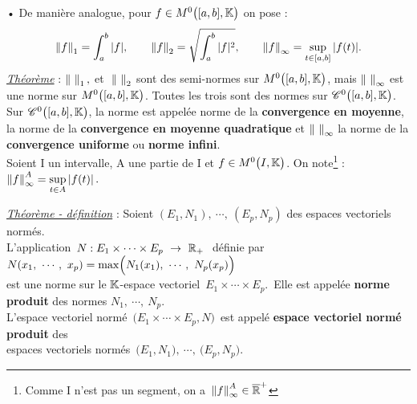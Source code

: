• De manière analogue, pour \(f\in M^0\bigl([a,b],\mathbb{K}\bigr) \) on pose :\vspace{-0.3cm}
\[ \left\lVert f\right\rVert_1=\int_a^b |f|, \qquad \left\lVert f\right\rVert_2=\sqrt{\int_a^b |f|^2}, \qquad \left\lVert f\right\rVert_\infty = \sup_{t\in [a,b]} |f(t)|.\]
\underline{\emph{Théorème}} : \(\left\lVert\ \right\rVert_1,\) et \(\ \left\lVert\ \right\rVert_2  \) sont des semi-normes sur \(M^0\bigl([a,b],\mathbb{K}\bigr)\), mais \(\left\lVert\ \right\rVert_\infty\) est une norme sur \(M^0\bigl([a,b],\mathbb{K}\bigr)\). Toutes les trois sont des normes sur \(\mathscr{C}^0\bigl([a,b],\mathbb{K}\bigr)\).\\
Sur \(\mathscr{C}^0\bigl([a,b],\mathbb{K}\bigr)\), la norme \normtxt{\ } est appelée norme de la \textbf{convergence en moyenne}, \normtxt{\ } la norme de la \textbf{convergence en moyenne quadratique} et \(\left\lVert\ \right\rVert_\infty \) la norme de la \textbf{convergence uniforme} ou \textbf{norme infini}.\\
Soient I un intervalle, A une partie de I et \(f\in M^0\bigl(I,\mathbb{K}\bigr)\). On note\footnote{Comme I n'est pas un segment, on a \(\,\left\lVert f\right\rVert_\infty^A\in \overline{\mathbb{R}}^+\)} : \(\displaystyle \left\lVert f\right\rVert_\infty^A=\sup_{t\in A}|f(t)|\,.\) 

\vspace{1.2cm}

\underline{\emph{Théorème - définition}} : Soient \((E_1,N_1),\ \cdots,\ (E_p,N_p)\) des espaces vectoriels normés.\\
L'application \(\,N : E_1\times \cdots \times E_p \ \to \ \mathbb{R}_+ \ \) définie par \( N(x_1,\ \cdots,\ x_p)= \max \Bigl( N_1(x_1),\ \cdots,\ N_p(x_p) \Bigr)  \) \\
est une norme sur le \(\mathbb{K}\)-espace vectoriel \(\,E_1\times \cdots \times E_p\).\, Elle est appelée \textbf{norme produit} des normes \(N_1,\ \cdots,\ N_p\).\\
L'espace vectoriel normé \(\,\bigl(E_1\times \cdots \times E_p, N\bigr)\, \) est appelé \textbf{espace vectoriel normé produit} des\vspace{0.1cm}\\
espaces vectoriels normés \(\,\bigl(E_1,N_1\bigr),\ \cdots,\ \bigl(E_p,N_p\bigr)\).

\vspace{1.2cm}

